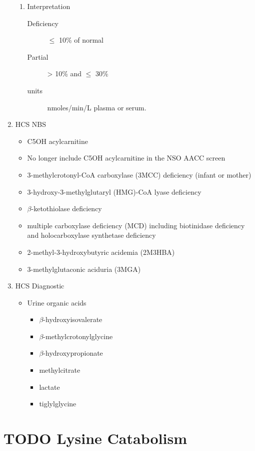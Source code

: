 \documentclass{scrartcl}
\begin{document}
\begin{enumerate}
\begin{enumerate}
\item Interpretation
\label{sec:org0dde6ed}
\begin{description}
\item[{Deficiency}] \(\le\) 10\% of normal
\item[{Partial}] \textgreater{} 10\% and \(\le\) 30\%
\item[{units}] nmoles/min/L plasma or serum.
\end{description}
\end{enumerate}

\item HCS NBS
\label{sec:orgbef1bde}
\begin{itemize}
\item C5OH acylcarnitine
\item No longer include C5OH acylcarnitine in the NSO AACC screen
\item 3-methylcrotonyl-CoA carboxylase (3MCC) deficiency (infant or mother)
\item 3-hydroxy-3-methylglutaryl (HMG)-CoA lyase deficiency
\item \(\beta\)-ketothiolase deficiency
\item multiple carboxylase deficiency (MCD) including biotinidase deficiency and holocarboxylase synthetase deficiency
\item 2-methyl-3-hydroxybutyric acidemia (2M3HBA)
\item 3-methylglutaconic aciduria (3MGA)
\end{itemize}

\item HCS Diagnostic
\label{sec:org8f5d2be}

\begin{itemize}
\item Urine organic acids
\begin{itemize}
\item \(\beta\)-hydroxyisovalerate
\item \(\beta\)-methylcrotonylglycine
\item \(\beta\)-hydroxypropionate
\item methylcitrate
\item lactate
\item tiglylglycine
\end{itemize}
\end{itemize}
\end{enumerate}


\section{{\bfseries\sffamily TODO} Lysine Catabolism}
\label{sec:orgc201038}
\end{document}
